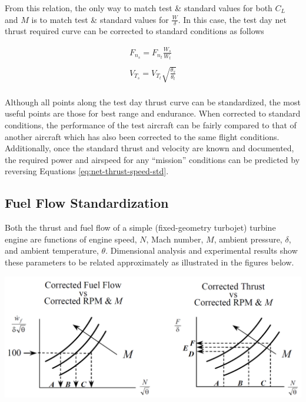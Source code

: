 \documentclass[
]{book}
\begin{document}
From this relation, the only way to match test \& standard values for both
\(C_L\) and \(M\) is to match test \& standard values for \(\frac{W}{\delta}\).
In this case, the test day net thrust required curve can be corrected to
standard conditions as follows

\[
\begin{align}
F_{n_s} = F_{n_t} \frac{W_s}{W_t}\\
\\
V_{T_s} = V_{T_t} \sqrt{\frac{\theta_s}{\theta_t}}\\
\end{align}
\label{eq:net-thrust-speed-std}
\]

Although all points along the test day thrust curve can be standardized, the
most useful points are those for best range and endurance. When corrected to
standard conditions, the performance of the test aircraft can be fairly compared
to that of another aircraft which has also been corrected to the same flight
conditions. Additionally, once the standard thrust and velocity are known and
documented, the required power and airspeed for any ``mission'' conditions can be
predicted by reversing Equations \eqref{eq:net-thrust-speed-std}.

\hypertarget{fuel-flow-standardization-1}{%
\subsection{Fuel Flow Standardization}\label{fuel-flow-standardization-1}}

Both the thrust and fuel flow of a simple (fixed-geometry turbojet) turbine
engine are functions of engine speed, \(N\), Mach number, \(M\), ambient
pressure, \(\delta\), and ambient temperature, \(\theta\). Dimensional analysis
and experimental results show these parameters to be related approximately as
illustrated in the figures below.

\includegraphics[width=8in,height=\textheight]{media/12/corr-fuel-flow-thrust-rpm-m.png}
\end{document}
